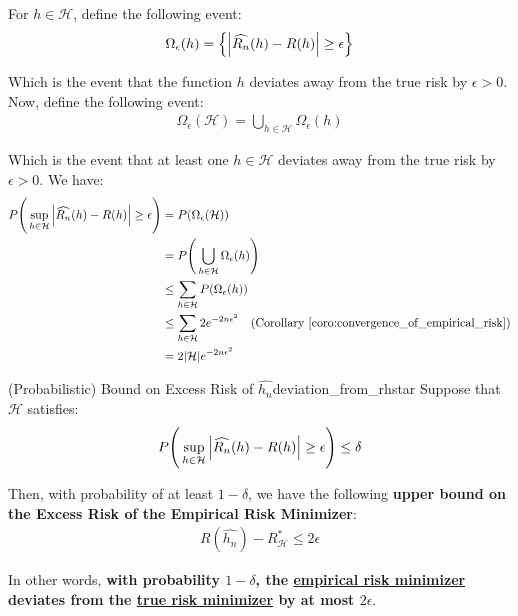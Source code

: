 \begin{proof*}
    For $h\in\mathcal{H}$, define the following event:
    \begin{align*}
        \Omega_\epsilon(h) = \Big\{ 
            \Big| 
                \widehat{R_n}(h) - R(h)
             \Big| \ge \epsilon
         \Big\}
    \end{align*}

    \noindent Which is the event that the function $h$ deviates away from the true risk by $\epsilon>0$. Now, define the following event:
    \begin{align*}
        \Omega_\epsilon(\mathcal{H}) = \bigcup_{h\in\mathcal{H}} \Omega_\epsilon (h)
    \end{align*}

    \noindent Which is the event that at least one $h\in\mathcal{H}$ deviates away from the true risk by $\epsilon>0$. We have:
    \begin{align*}
        P\biggRound{
            \sup_{h\in\mathcal{H}}\bigAbs{\widehat{R_n}(h) - R(h)} \ge \epsilon
        } &= P(\Omega_\epsilon(\mathcal{H})) \\
        &= P\biggRound{
            \bigcup_{h\in\mathcal{H}} \Omega_\epsilon (h)
        } \\
        &\le \sum_{h\in\mathcal{H}} P(\Omega_\epsilon(h)) \\
        &\le \sum_{h\in\mathcal{H}} 2e^{-2n\epsilon^2} \ \ \ (\text{Corollary \ref{coro:convergence_of_empirical_risk}}) \\ 
        &= 2|\mathcal{H}|e^{-2n\epsilon^2}
    \end{align*}
\end{proof*}

\begin{proposition}{(Probabilistic) Bound on Excess Risk of $\widehat{h_n}$}{deviation_from_rhstar}
    Suppose that $\mathcal{H}$ satisfies:
    \begin{align*}
        P\Bigg( 
            \sup_{h\in\mathcal{H}}\Big| \widehat{R_n}(h) - R(h) \Big| \ge \epsilon
         \Bigg) \le \delta
    \end{align*}

    \noindent Then, with probability of at least $1-\delta$, we have the following \textbf{upper bound on the Excess Risk of the Empirical Risk Minimizer}:
    \begin{align*}
        R(\widehat{h_n}) - R_\mathcal{H}^* \le 2\epsilon
    \end{align*}

    \noindent In other words, \textbf{with probability $1-\delta$, the \underline{empirical risk minimizer} deviates from the \underline{true risk minimizer} by at most $2\epsilon$}.
\end{proposition}

